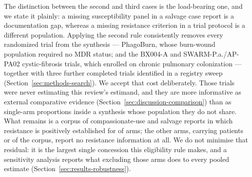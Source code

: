 \begin{itemize}
The distinction between the second and third cases is the load-bearing one, and we state it plainly: a missing susceptibility panel in a salvage case report is a documentation gap, whereas a missing resistance criterion in a trial protocol is a different population. Applying the second rule consistently removes every randomized trial from the synthesis --- PhagoBurn, whose burn-wound population required no MDR status; and the BX004-A and SWARM-P.a./AP-PA02 cystic-fibrosis trials, which enrolled on chronic pulmonary colonization --- together with three further completed trials identified in a registry sweep (Section~\ref{sec:methods-search}). We accept that cost deliberately. Those trials were never estimating this review's estimand, and they are more informative as external comparative evidence (Section~\ref{sec:discussion-comparison}) than as single-arm proportions inside a synthesis whose population they do not share. What remains is a corpus of compassionate-use and salvage reports in which resistance is positively established for \ResClassifiedArms of \ArmsAnalysed arms; the other \ResNotClassifiableArms arms, carrying \ResNotClassifiablePatients patients or \ResNotClassifiablePct of the corpus, report no resistance information at all. We do not minimise that residual: it is the largest single concession this eligibility rule makes, and a sensitivity analysis reports what excluding those arms does to every pooled estimate (Section~\ref{sec:results-robustness}).

\end{itemize}
